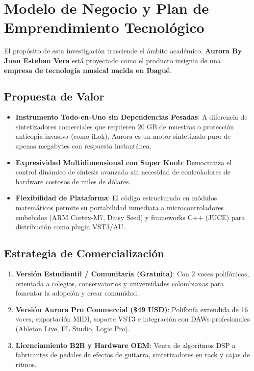 \documentclass[11pt,a4paper]{article}
\begin{document}
\section{Modelo de Negocio y Plan de Emprendimiento Tecnológico}

El propósito de esta investigación trasciende el ámbito académico. \textbf{Aurora By Juan Esteban Vera} está proyectado como el producto insignia de una \textbf{empresa de tecnología musical nacida en Ibagué}.

\subsection{Propuesta de Valor}
\begin{itemize}
    \item \textbf{Instrumento Todo-en-Uno sin Dependencias Pesadas}: A diferencia de sintetizadores comerciales que requieren 20 GB de muestras o protección anticopia invasiva (como iLok), Aurora es un motor sintetizado puro de apenas megabytes con respuesta instantánea.
    \item \textbf{Expresividad Multidimensional con Super Knob}: Democratiza el control dinámico de síntesis avanzada sin necesidad de controladores de hardware costosos de miles de dólares.
    \item \textbf{Flexibilidad de Plataforma}: El código estructurado en módulos matemáticos permite su portabilidad inmediata a microcontroladores embebidos (ARM Cortex-M7, Daisy Seed) y frameworks C++ (JUCE) para distribución como plugin VST3/AU.
\end{itemize}

\subsection{Estrategia de Comercialización}
\begin{enumerate}
    \item \textbf{Versión Estudiantil / Comunitaria (Gratuita)}: Con 2 voces polifónicas, orientada a colegios, conservatorios y universidades colombianas para fomentar la adopción y crear comunidad.
    \item \textbf{Versión Aurora Pro Commercial (\$49 USD)}: Polifonía extendida de 16 voces, exportación MIDI, soporte VST3 e integración con DAWs profesionales (Ableton Live, FL Studio, Logic Pro).
    \item \textbf{Licenciamiento B2B y Hardware OEM}: Venta de algoritmos DSP a fabricantes de pedales de efectos de guitarra, sintetizadores en rack y cajas de ritmos.
\end{enumerate}
\end{document}
